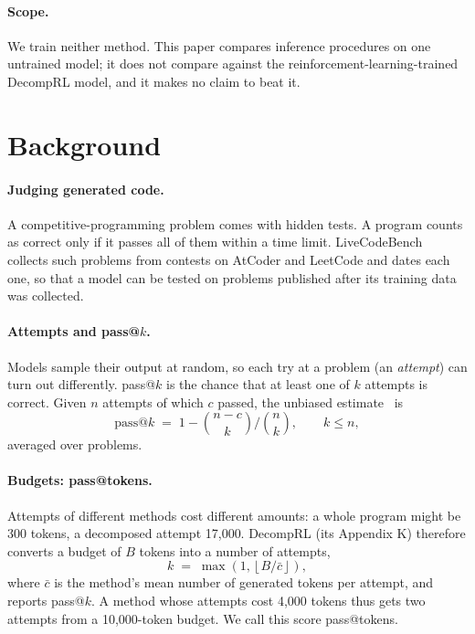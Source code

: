 \documentclass[11pt]{article}
\begin{document}
\paragraph{Scope.} We train neither method. This paper compares inference procedures on one untrained model; it does
not compare against the reinforcement-learning-trained DecompRL model, and it makes no claim to beat it.

\section{Background}
\label{sec:background}

\paragraph{Judging generated code.} A competitive-programming problem comes with hidden tests. A program counts as
correct only if it passes all of them within a time limit. LiveCodeBench~\citep{jain2024livecodebench} collects such
problems from contests on AtCoder and LeetCode and dates each one, so that a model can be tested on problems published
after its training data was collected.

\paragraph{Attempts and pass@$k$.} Models sample their output at random, so each try at a problem (an
\emph{attempt}) can turn out differently. pass@$k$ is the chance that at least one of $k$ attempts is correct.
Given $n$ attempts of which $c$ passed, the unbiased estimate~\citep{chen2021codex} is
\begin{equation}
  \text{pass@}k \;=\; 1 - \binom{n-c}{k} \Big/ \binom{n}{k}, \qquad k \le n,
  \label{eq:passk}
\end{equation}
averaged over problems.

\paragraph{Budgets: pass@tokens.} Attempts of different methods cost different amounts: a whole program might be 300
tokens, a decomposed attempt 17,000. DecompRL (its Appendix K) therefore converts a budget of $B$ tokens into a number
of attempts,
\begin{equation}
  k \;=\; \max\!\left(1, \left\lfloor B / \bar c \right\rfloor\right),
  \label{eq:budget}
\end{equation}
where $\bar c$ is the method's mean number of generated tokens per attempt, and reports pass@$k$. A method whose
attempts cost 4,000 tokens thus gets two attempts from a 10,000-token budget. We call this score pass@tokens.
\end{document}
